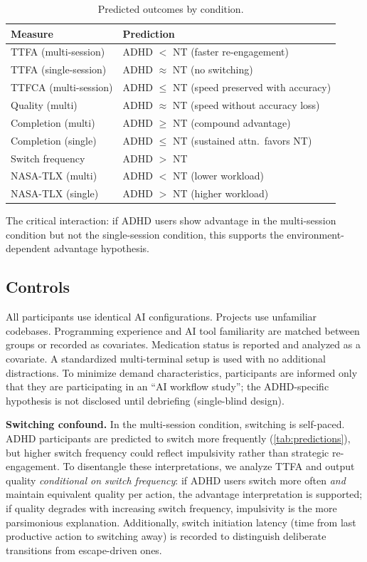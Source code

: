 \documentclass[sigconf,nonacm]{acmart}
\begin{document}
\begin{table}[htbp]
\caption{Predicted outcomes by condition.}
\label{tab:predictions}
\begin{tabular}{@{}ll@{}}
\toprule
\textbf{Measure} & \textbf{Prediction} \\
\midrule
TTFA (multi-session) & ADHD $<$ NT (faster re-engagement) \\
TTFA (single-session) & ADHD $\approx$ NT (no switching) \\
TTFCA (multi-session) & ADHD $\leq$ NT (speed preserved with accuracy) \\
Quality (multi) & ADHD $\approx$ NT (speed without accuracy loss) \\
Completion (multi) & ADHD $\geq$ NT (compound advantage) \\
Completion (single) & ADHD $\leq$ NT (sustained attn.\ favors NT) \\
Switch frequency & ADHD $>$ NT \\
NASA-TLX (multi) & ADHD $<$ NT (lower workload) \\
NASA-TLX (single) & ADHD $>$ NT (higher workload) \\
\bottomrule
\end{tabular}
\end{table}

The critical interaction: if ADHD users show advantage in the multi-session condition but not the single-session condition, this supports the environment-dependent advantage hypothesis.

\subsection{Controls}

All participants use identical AI configurations. Projects use unfamiliar codebases. Programming experience and AI tool familiarity are matched between groups or recorded as covariates. Medication status is reported and analyzed as a covariate. A standardized multi-terminal setup is used with no additional distractions. To minimize demand characteristics, participants are informed only that they are participating in an ``AI workflow study''; the ADHD-specific hypothesis is not disclosed until debriefing (single-blind design).

\textbf{Switching confound.} In the multi-session condition, switching is self-paced. ADHD participants are predicted to switch more frequently (\autoref{tab:predictions}), but higher switch frequency could reflect impulsivity rather than strategic re-engagement. To disentangle these interpretations, we analyze TTFA and output quality \emph{conditional on switch frequency}: if ADHD users switch more often \emph{and} maintain equivalent quality per action, the advantage interpretation is supported; if quality degrades with increasing switch frequency, impulsivity is the more parsimonious explanation. Additionally, switch initiation latency (time from last productive action to switching away) is recorded to distinguish deliberate transitions from escape-driven ones.
\end{document}
